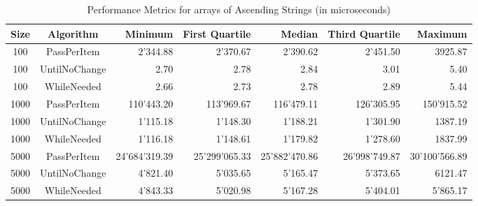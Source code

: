 \documentclass{article}
\begin{document}
\begin{table}[htbp]
    \centering
    \begin{tabular}{ccrrrrr}
        \toprule
        \textbf{Size} & \textbf{Algorithm} & \textbf{Minimum} & \textbf{First Quartile} & \textbf{Median} & \textbf{Third Quartile} & \textbf{Maximum} \\
        \midrule
        100 & PassPerItem & 2'344.88 & 2'370.67 & 2'390.62 & 2'451.50 & 3925.87 \\
        100 & UntilNoChange & 2.70 & 2.78 & 2.84 & 3.01 & 5.40 \\
        100 & WhileNeeded & 2.66 & 2.73 & 2.78 & 2.89 & 5.44 \\
        1000 & PassPerItem & 110'443.20 & 113'969.67 & 116'479.11 & 126'305.95 & 150'915.52 \\
        1000 & UntilNoChange & 1'115.18 & 1'148.30 & 1'188.21 & 1'301.90 & 1387.19 \\
        1000 & WhileNeeded & 1'116.18 & 1'148.61 & 1'179.82 & 1'278.60 & 1837.99 \\
        5000 & PassPerItem & 24'684'319.39 & 25'299'065.33 & 25'882'470.86 & 26'998'749.87 & 30'100'566.89 \\
        5000 & UntilNoChange & 4'821.40 & 5'035.65 & 5'165.47 & 5'373.65 & 6121.47 \\
        5000 & WhileNeeded & 4'843.33 & 5'020.98 & 5'167.28 & 5'404.01 & 5'865.17 \\
        \bottomrule
    \end{tabular}
    \caption{Performance Metrics for arrays of Ascending Strings (in microseconds)}
    \label{tab:performance_7}
\end{table}
\end{document}
